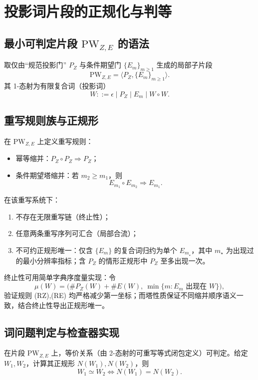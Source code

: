 \section{投影词片段的正规化与判等}\label{app:pw-fragment}

\subsection{最小可判定片段 \texorpdfstring{$\mathrm{PW}_{Z,E}$}{PW\_{Z,E}} 的语法}
取仅由“规范投影门” $P_Z$ 与条件期望门 $\{E_m\}_{m\ge 1}$ 生成的局部子片段
$$
\mathrm{PW}_{Z,E}=\langle P_Z,\{E_m\}_{m\ge 1}\rangle.
$$
其 1-态射为有限复合词（投影词）
$$
W ::= \epsilon \mid P_Z \mid E_m \mid W\circ W.
$$

\subsection{重写规则族与正规形}
在 $\mathrm{PW}_{Z,E}$ 上定义重写规则：
\begin{itemize}
  \item[(RZ)] 幂等缩并：$P_Z\circ P_Z \Rightarrow P_Z$；
  \item[(RE)] 条件期望塔缩并：若 $m_2\ge m_1$，则
  $$
  E_{m_1}\circ E_{m_2}\Rightarrow E_{m_1}.
  $$
\end{itemize}
在该重写系统下：
\begin{enumerate}
  \item 不存在无限重写链（终止性）；
  \item 任意两条重写序列可汇合（局部合流）；
  \item 不可约正规形唯一：仅含 $\{E_m\}$ 的复合词归约为单个 $E_{m_\star}$，其中 $m_\star$ 为出现过的最小分辨率指标；含 $P_Z$ 的情形正规形中 $P_Z$ 至多出现一次。
\end{enumerate}
终止性可用简单字典序度量实现：令
$$
\mu(W)=\bigl(\#P_Z(W)+\#E(W),\ \min\{m:E_m\text{ 出现在 }W\}\bigr),
$$
验证规则 (RZ),(RE) 均严格减少第一坐标；而塔性质保证不同缩并顺序语义一致，结合终止性导出正规形唯一。

\subsection{词问题判定与检查器实现}
\begin{theorem}[词问题可判定]\label{thm:pw-ze-decidable}
在片段 $\mathrm{PW}_{Z,E}$ 上，等价关系（由 2-态射的可重写等式闭包定义）可判定。给定 $W_1,W_2$，计算其正规形 $N(W_1),N(W_2)$，则
$$
W_1\simeq W_2 \Longleftrightarrow N(W_1)=N(W_2).
$$
\end{theorem}


